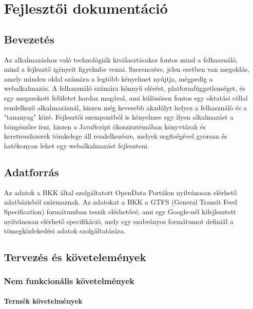 \chapter{Fejlesztői dokumentáció}
\label{ch:dev}

\section{Bevezetés}

Az alkalmazáshoz való technológiák kiválasztásakor fontos mind a felhasználó, mind a fejlesztő igényeit figyelmbe venni. Szerencsére, jelen esetben van megoldás, amely minden oldal számára a legtöbb kényelmet nyújtja, mégpedig a webalkalmazás. A felhasználó számára könnyű elérést, platformfüggetlenséget, és egy megszokott felületet hordoz magával, ami különösen fontos egy oktatási céllal rendelkező alkalmazásnál, hiszen még kevesebb akadályt helyez a felhasználó és a "tananyag" közé. Fejlesztői szempontból is kényelmes egy ilyen alkalmazást a böngészőre írni, hiszen a JavaScript ökoszisztémában könyvtárak és keretrendszerek tömkelege áll rendelkezésre, melyek segítségével gyorsan és hatékonyan lehet egy webalkalmazást fejleszteni.

\section{Adatforrás}

Az adatok a BKK által szolgáltatott OpenData Portálon\cite{bkkopendata} nyilvánosan elérhető adatbázisból származnak. Az adatokat a BKK a GTFS (General Transit Feed Specification) formátumban teszik elérhetővé, ami egy Google-nél kifejlesztett\cite{gtfsabout} nyilvánosan elérhető specifikáció, mely egy szabványos formátumot definiál a tömegközlekedési adatok szolgáltatására.

\section{Tervezés és követelemények}

\subsection{Nem funkcionális követelmények}

\subsubsection{Termék követelmények}

